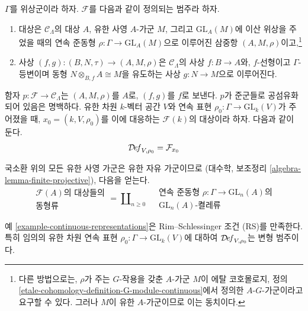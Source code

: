 \begin{example}[위상군의 표현]
\label{example-continuous-representations}
$\Gamma$를 위상군이라 하자. $\mathcal{F}$를 다음과 같이 정의되는
범주라 하자.
\begin{enumerate}
\item 대상은 $\mathcal{C}_\Lambda$의 대상 $A$, 유한 사영 $A$-가군 $M$,
그리고 $\text{GL}_A(M)$에 이산 위상을 주었을 때의 연속 준동형
$\rho : \Gamma \to \text{GL}_A(M)$으로 이루어진 삼중항
$(A, M, \rho)$이고,\footnote{%
다른 방법으로는, $\rho$가 주는 $G$-작용을 갖춘 $A$-가군 $M$이
에탈 코호몰로지, 정의
\ref{etale-cohomology-definition-G-module-continuous}에서 정의한
$A\text{-}G$-가군이라고 요구할 수 있다. 그러나 $M$이 유한
$A$-가군이므로 이는 동치이다.}
\item 사상 $(f, g) : (B, N, \tau) \to (A, M, \rho)$은
$\mathcal{C}_\Lambda$의 사상 $f : B \to A$와, $f$-선형이고
$\Gamma$-등변이며 동형 $N \otimes_{B, f} A \cong M$을 유도하는
사상 $g : N \to M$으로 이루어진다.%
\end{enumerate}
함자 $p : \mathcal{F} \to \mathcal{C}_\Lambda$는 $(A, M, \rho)$를 $A$로,
$(f, g)$를 $f$로 보낸다. $p$가 준군들로 공섬유화되어 있음은 명백하다.
유한 차원 $k$-벡터 공간 $V$와 연속 표현
$\rho_0 : \Gamma \to \text{GL}_k(V)$가 주어졌을 때,
$x_0 = (k, V, \rho_0)$를 이에 대응하는 $\mathcal{F}(k)$의 대상이라 하자.
다음과 같이 둔다.
$$
\mathcal{D}\!\mathit{ef}_{V, \rho_0} = \mathcal{F}_{x_0}
$$
\end{example}

\noindent
국소환 위의 모든 유한 사영 가군은 유한 자유 가군이므로
(대수학, 보조정리 \ref{algebra-lemma-finite-projective}), 다음을 얻는다.
$$
\begin{matrix}
\mathcal{F}(A)\text{의 대상들의} \\
\text{동형류}
\end{matrix}
=
\coprod\nolimits_{n \geq 0}\quad
\begin{matrix}
\text{연속 준동형 }\rho : \Gamma \to \text{GL}_n(A)\text{의}\\
\text{GL}_n(A)\text{-켤레류}
\end{matrix}
$$

\begin{lemma}
\label{lemma-continuous-representations-RS}
예 \ref{example-continuous-representations}은 Rim--Schlessinger 조건
(RS)를 만족한다. 특히 임의의 유한 차원 연속 표현
$\rho_0 : \Gamma \to \text{GL}_k(V)$에 대하여
$\mathcal{D}\!\mathit{ef}_{V, \rho_0}$는 변형 범주이다.
\end{lemma}


